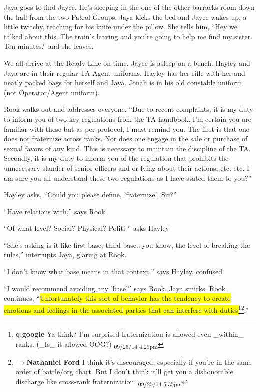 Jaya goes to find Jayce.  He's sleeping in the one of the other barracks room down the hall from the two Patrol Groups.  Jaya kicks the bed and Jayce wakes up, a little twitchy, reaching for his knife under the pillow.  She tells him, ``Hey we talked about this.  The train's leaving and you're going to help me find my sister.   Ten minutes.'' and she leaves.



We all arrive at the Ready Line on time.  Jayce is asleep on a bench.  Hayley and Jaya are in their regular TA Agent uniforms.  Hayley has her rifle with her and neatly packed bags for herself and Jaya.  Jonah is in his old constable uniform (not Operator/Agent uniform).  



Rook walks out and addresses everyone.  ``Due to recent complaints, it is my duty to inform you of two key regulations from the TA handbook.  I'm certain you are familiar with these but as per protocol, I must remind you.  The first is that one does not fraternize across ranks.  Nor does one engage in the sale or purchase of sexual favors of any kind.  This is necessary to maintain the discipline of the TA. Secondly, it is my duty to inform you of the regulation that prohibits the unnecessary slander of senior officers and or lying about their actions, etc. etc.  I am sure you all understand these two regulations as I have stated them to you?''

Hayley asks, ``Could you please define, 'fraternize', Sir?''

``Have relations with,'' says Rook

``Of what level? Social?  Physical?  Politi-'' asks Hayley

``She's asking is it like first base, third base...you know, the level of breaking the rules,'' interrupts Jaya, glaring at Rook.

``I don't know what base means in that context,'' says Hayley, confused.

``I would recommend avoiding any 'base''' says Rook.  Jaya smirks.  Rook continues, ``\hl{Unfortunately this sort of behavior has the tendency to create emotions and feelings in the associated parties that can interfere with duties}\footnote{\textbf{q.google }Ya think?  I'm surprised fraternization is allowed even \_within\_ ranks.  (\_Is\_ it allowed OOG?) \textsubscript{09/25/14 4:29pm}}\footnote{$\rightarrow$\textbf{Nathaniel Ford }I think it's discouraged, especially if you're in the same order of battle/org chart. But I don't think it'll get you a dishonorable discharge like cross-rank fraternization. \textsubscript{09/25/14 5:35pm}}.''

